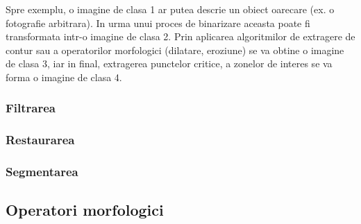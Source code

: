 \documentclass[10pt]{article}
\begin{document}
\> Spre exemplu, o imagine de clasa 1 ar putea descrie un obiect oarecare (ex. o fotografie arbitrara).
In urma unui proces de binarizare aceasta poate fi transformata intr-o imagine de clasa 2.
Prin aplicarea algoritmilor de extragere de contur sau a operatorilor morfologici (dilatare,
eroziune) se va obtine o imagine de clasa 3, iar in final, extragerea punctelor critice,
a zonelor de interes se va forma o imagine de clasa 4.

\subsubsection{Filtrarea}

\subsubsection{Restaurarea}

\subsubsection{Segmentarea}

\subsection{Operatori morfologici}
\end{document}
